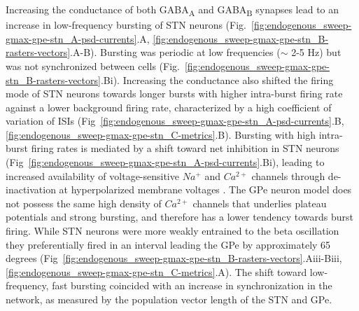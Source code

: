 %
Increasing the conductance of both GABA\textsubscript{A} and GABA\textsubscript{B} synapses lead to an increase in low-frequency bursting of STN neurons (Fig.~\ref{fig:endogenous_sweep-gmax-gpe-stn_A-psd-currents}.A, \ref{fig:endogenous_sweep-gmax-gpe-stn_B-rasters-vectors}.A-B). Bursting was periodic at low frequencies ($\sim$ 2-5 Hz) but was not synchronized between cells (Fig.~\ref{fig:endogenous_sweep-gmax-gpe-stn_B-rasters-vectors}.Bi). Increasing the conductance also shifted the firing mode of STN neurons towards longer bursts with higher intra-burst firing rate against a lower background firing rate, characterized by a high coefficient of variation of ISIs (Fig~\ref{fig:endogenous_sweep-gmax-gpe-stn_A-psd-currents}.B, \ref{fig:endogenous_sweep-gmax-gpe-stn_C-metrics}.B). Bursting with high intra-burst firing rates is mediated by a shift toward net inhibition in STN neurons (Fig~\ref{fig:endogenous_sweep-gmax-gpe-stn_A-psd-currents}.Bi), leading to increased availability of voltage-sensitive $Na^+$ and $Ca^{2+}$ channels through de-inactivation at hyperpolarized membrane voltages \cite{gillies_membrane_2005,baufreton_enhancement_2005,hallworth_globus_2005}. The GPe neuron model does not possess the same high density of $Ca^{2+}$ channels that underlies plateau potentials and strong bursting, and therefore has a lower tendency towards burst firing.
While STN neurons were more weakly entrained to the beta oscillation they preferentially fired in an interval leading the GPe by approximately 65 degrees (Fig~\ref{fig:endogenous_sweep-gmax-gpe-stn_B-rasters-vectors}.Aiii-Biii, \ref{fig:endogenous_sweep-gmax-gpe-stn_C-metrics}.A). The shift toward low-frequency, fast bursting coincided with an increase in synchronization in the network, as measured by the population vector length of the STN and GPe.
%
%
%
%

